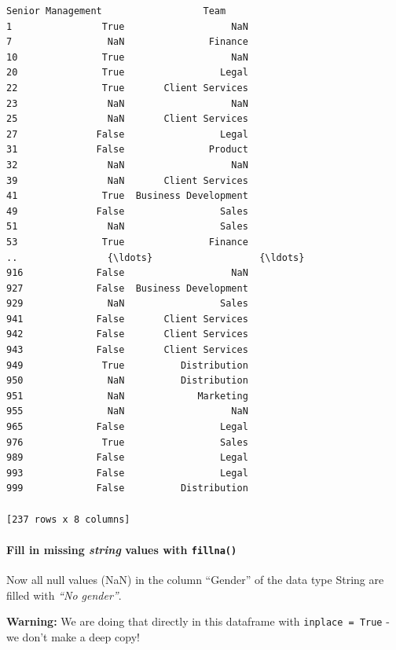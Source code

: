 \documentclass [oneside,10pt,a4paper,ngerman,BCOR10mm,headsepline,parindent,final]{scrartcl}
\begin{document}
\begin{tcolorbox}[breakable, size=fbox, boxrule=.5pt, pad at break*=1mm, opacityfill=0]
\begin{Verbatim}[commandchars=\\\{\}]
    Senior Management                  Team
1                True                   NaN
7                 NaN               Finance
10               True                   NaN
20               True                 Legal
22               True       Client Services
23                NaN                   NaN
25                NaN       Client Services
27              False                 Legal
31              False               Product
32                NaN                   NaN
39                NaN       Client Services
41               True  Business Development
49              False                 Sales
51                NaN                 Sales
53               True               Finance
..                {\ldots}                   {\ldots}
916             False                   NaN
927             False  Business Development
929               NaN                 Sales
941             False       Client Services
942             False       Client Services
943             False       Client Services
949              True          Distribution
950               NaN          Distribution
951               NaN             Marketing
955               NaN                   NaN
965             False                 Legal
976              True                 Sales
989             False                 Legal
993             False                 Legal
999             False          Distribution

[237 rows x 8 columns]
\end{Verbatim}
\end{tcolorbox}
        
    \hypertarget{fill-in-missing-string-values-with-fillna}{%
\paragraph{\texorpdfstring{Fill in missing \emph{string} values with
\texttt{fillna()}}{Fill in missing string values with fillna()}}\label{fill-in-missing-string-values-with-fillna}}

Now all null values (NaN) in the column ``Gender'' of the data type
String are filled with \emph{``No gender''}.

\textbf{Warning:} We are doing that directly in this dataframe with
\texttt{inplace\ =\ True} - we don't make a deep copy!
\end{document}
